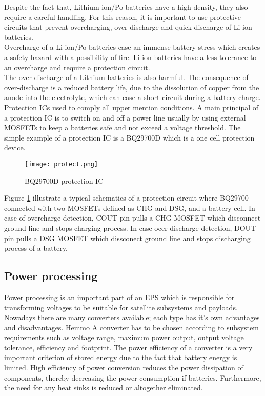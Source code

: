 Despite the fact that, Lithium-ion/Po batteries have a high density, they also require a careful handling. For this reason, it is important to use protective circuits that prevent overcharging, over-discharge and quick discharge of Li-ion batteries.\\
\cite{16} Overcharge of a Li-ion/Po batteries case an immense battery stress which creates a safety hazard with a possibility of fire. Li-ion batteries have a less tolerance to an overcharge and require a protection circuit.\\
The over-discharge of a Lithium batteries is also harmful. The consequence of over-discharge is a reduced battery life, due to the dissolution of copper from the anode into the electrolyte, which can case a short circuit during a battery charge.\\
Protection ICs used to comply all upper mention conditions. A main principal of a protection IC is to switch on and off a power line usually by using external MOSFETs to keep a batteries safe and not exceed a voltage threshold. The simple example of a protection IC is a BQ29700D which is a one cell protection device. 

\begin{figure}[h]
	\centering
	\texttt{[image: protect.png]}
	\caption{ BQ29700D protection IC \cite{17}}
	\label{fig: EPS1}
\end{figure}

Figure \ref{fig: EPS1} illustrate a typical schematics of a protection circuit where BQ29700 connected with two MOSFETs defined as CHG and DSG, and a battery cell. In case of overcharge detection, COUT pin pulls a CHG MOSFET which disconnect ground line and stops charging process. In case ocer-discharge detection, DOUT pin pulls a DSG MOSFET which dissconect ground line and stops discharging process of a battery.

\subsection{Power processing \label{sec:tech}}

Power processing is an important part of an EPS which is responsible for transforming voltages to be suitable for satellite subsystems and payloads. Nowadays there are many converters available; each type has it's own advantages and disadvantages. Hemmo\cite{18} A converter has to be chosen according to subsystem requirements such as voltage range, maximum power output, output voltage tolerance, efficiency and footprint. The power efficiency of a converter is a very important criterion of stored energy due to the fact that battery energy is limited. High efficiency of  power conversion reduces the power dissipation of  components, thereby decreasing the power consumption if batteries. Furthermore, the need for any heat sinks is reduced or altogether eliminated. 

